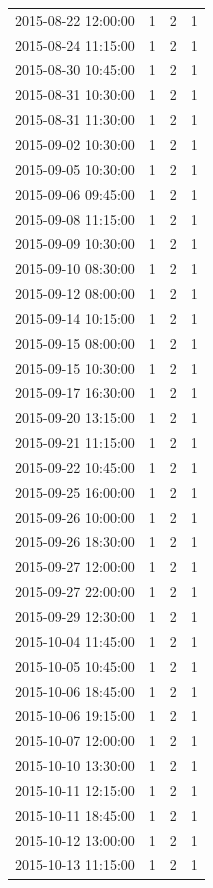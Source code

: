 \begin{tabular}{lrrr}
2015-08-22 12:00:00 & 1 & 2 & 1 \\
2015-08-24 11:15:00 & 1 & 2 & 1 \\
2015-08-30 10:45:00 & 1 & 2 & 1 \\
2015-08-31 10:30:00 & 1 & 2 & 1 \\
2015-08-31 11:30:00 & 1 & 2 & 1 \\
2015-09-02 10:30:00 & 1 & 2 & 1 \\
2015-09-05 10:30:00 & 1 & 2 & 1 \\
2015-09-06 09:45:00 & 1 & 2 & 1 \\
2015-09-08 11:15:00 & 1 & 2 & 1 \\
2015-09-09 10:30:00 & 1 & 2 & 1 \\
2015-09-10 08:30:00 & 1 & 2 & 1 \\
2015-09-12 08:00:00 & 1 & 2 & 1 \\
2015-09-14 10:15:00 & 1 & 2 & 1 \\
2015-09-15 08:00:00 & 1 & 2 & 1 \\
2015-09-15 10:30:00 & 1 & 2 & 1 \\
2015-09-17 16:30:00 & 1 & 2 & 1 \\
2015-09-20 13:15:00 & 1 & 2 & 1 \\
2015-09-21 11:15:00 & 1 & 2 & 1 \\
2015-09-22 10:45:00 & 1 & 2 & 1 \\
2015-09-25 16:00:00 & 1 & 2 & 1 \\
2015-09-26 10:00:00 & 1 & 2 & 1 \\
2015-09-26 18:30:00 & 1 & 2 & 1 \\
2015-09-27 12:00:00 & 1 & 2 & 1 \\
2015-09-27 22:00:00 & 1 & 2 & 1 \\
2015-09-29 12:30:00 & 1 & 2 & 1 \\
2015-10-04 11:45:00 & 1 & 2 & 1 \\
2015-10-05 10:45:00 & 1 & 2 & 1 \\
2015-10-06 18:45:00 & 1 & 2 & 1 \\
2015-10-06 19:15:00 & 1 & 2 & 1 \\
2015-10-07 12:00:00 & 1 & 2 & 1 \\
2015-10-10 13:30:00 & 1 & 2 & 1 \\
2015-10-11 12:15:00 & 1 & 2 & 1 \\
2015-10-11 18:45:00 & 1 & 2 & 1 \\
2015-10-12 13:00:00 & 1 & 2 & 1 \\
2015-10-13 11:15:00 & 1 & 2 & 1 \\

\end{tabular}
